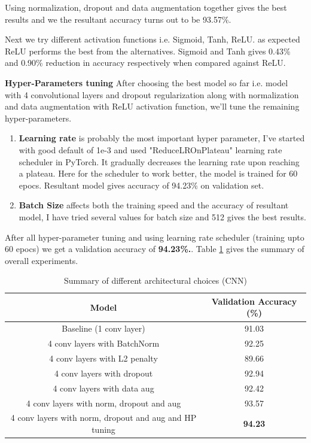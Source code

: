 \documentclass[10pt,a4paper]{article}
\begin{document}
Using normalization, dropout and data augmentation together gives the best results and we the resultant accuracy turns out to be 93.57\%.

Next we try different activation functions i.e. Sigmoid, Tanh, ReLU. as expected ReLU performs the best from the alternatives. Sigmoid and Tanh gives 0.43\% and 0.90\% reduction in accuracy respectively when compared against ReLU.

\textbf{Hyper-Parameters tuning} After choosing the best model so far i.e. model with 4 convolutional layers and dropout regularization along with normalization and data augmentation with ReLU activation function, we'll tune the remaining hyper-parameters.
\begin{enumerate}
\item \textbf{Learning rate} is probably the most important hyper parameter, I've started with good default of 1e-3 and used "ReduceLROnPlateau" learning rate scheduler in PyTorch. It gradually decreases the learning rate upon reaching a plateau. Here for the scheduler to work better, the model is trained for 60 epocs. Resultant model gives accuracy of 94.23\% on validation set.

\item \textbf{Batch Size} affects both the training speed and the accuracy of resultant model, I have tried several values for batch size and 512 gives the best results.

\end{enumerate}

After all hyper-parameter tuning and using learning rate scheduler (training upto 60 epocs) we get a validation accuracy of \textbf{94.23\%.}. Table \ref{table:2} gives the summary of overall experiments.

\begin{table}[h!]
\centering
\begin{tabular}{|c| c|} 
 \hline
 Model & Validation Accuracy (\%) \\
 \hline\hline
 Baseline (1 conv layer) & 91.03 \\ 
 \hline
 4 conv layers with BatchNorm & 92.25 \\ 
 \hline
4 conv layers with L2 penalty & 89.66 \\ 
 \hline
 4 conv layers with dropout & 92.94 \\ 
 \hline
4 conv layers with data aug & 92.42 \\ 
 \hline
4 conv layers with norm, dropout and aug & 93.57 \\ 
 \hline
4 conv layers with norm, dropout and aug and HP tuning & \textbf{94.23} \\ 
 \hline

\end{tabular}
\caption{Summary of different architectural choices (CNN) }
\label{table:2}
\end{table}
\end{document}
